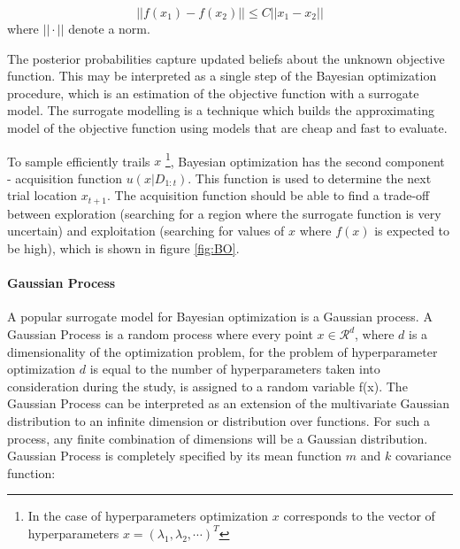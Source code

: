 \begin{equation}
||f(x_1)-f(x_2)|| \leq C ||x_1-x_2|| 
\end{equation}
where  $||\cdot ||$ denote a norm.


The posterior probabilities capture updated beliefs about the unknown objective function. 
This may be interpreted as a single step of the Bayesian optimization procedure, which is an estimation of the objective function with a surrogate model. The surrogate modelling is a technique which builds the approximating model of the objective function using models that are cheap and fast to evaluate. 

To sample efficiently trails $x$ \footnote{In the case of hyperparameters optimization $x$ corresponds to the vector of hyperparameters $x= (\lambda_1, \lambda_2, \cdots)^{T}$}, Bayesian optimization has the second component - acquisition function $u(x|D_{1:t})$. This function is used to determine the next trial location $x_{t+1}$. The acquisition function should be able to find a trade-off between exploration (searching for a region where the surrogate function is very uncertain) and exploitation (searching for values of $x$ where $f(x)$ is expected to be high), which is shown in figure \ref{fig:BO}. 


\paragraph{Gaussian Process} \mbox{}

A popular surrogate model for Bayesian optimization is a Gaussian process. 
A Gaussian Process is a random process where every point $x \in \mathcal{R}^{d}$, where $d$ is a dimensionality of the optimization problem, for the problem of hyperparameter optimization $d$ is equal to the number of hyperparameters taken into consideration during the study, 
is assigned to a random variable f(x). The Gaussian Process can be interpreted as an extension of the multivariate Gaussian distribution to an infinite dimension or distribution over functions. For such a process, any finite combination of dimensions will be a Gaussian distribution. Gaussian Process is completely specified by its mean function $m$ and $k$ covariance function: 

